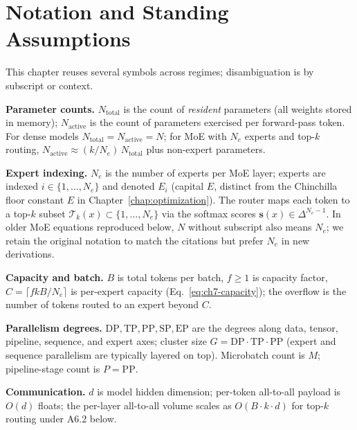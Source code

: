 \section{Notation and Standing Assumptions}
\label{sec:ch7-notation}

\begin{notationbox}
This chapter reuses several symbols across regimes; disambiguation is
by subscript or context.

\textbf{Parameter counts.}
$N_{\mathrm{total}}$ is the count of \emph{resident} parameters (all
weights stored in memory); $N_{\mathrm{active}}$ is the count of
parameters exercised per forward-pass token. For dense models
$N_{\mathrm{total}} = N_{\mathrm{active}} = N$; for MoE with $N_e$
experts and top-$k$ routing,
$N_{\mathrm{active}} \approx (k/N_e)\,N_{\mathrm{total}}$ plus
non-expert parameters.

\textbf{Expert indexing.}
$N_e$ is the number of experts per MoE layer; experts are indexed
$i \in \{1, \ldots, N_e\}$ and denoted $E_i$ (capital $E$, distinct
from the Chinchilla floor constant $E$ in Chapter~\ref{chap:optimization}). The router maps
each token to a top-$k$ subset $\mathcal{T}_k(x) \subset \{1, \ldots,
N_e\}$ via the softmax scores $\mathbf{s}(x) \in \Delta^{N_e - 1}$.
In older MoE equations reproduced below, $N$ without subscript also
means $N_e$; we retain the original notation to match the citations
but prefer $N_e$ in new derivations.

\textbf{Capacity and batch.}
$B$ is total tokens per batch, $f \ge 1$ is capacity factor,
$C = \lceil f k B / N_e \rceil$ is per-expert capacity
(Eq.~\eqref{eq:ch7-capacity}); the overflow is the number of tokens
routed to an expert beyond $C$.

\textbf{Parallelism degrees.}
$\mathrm{DP}, \mathrm{TP}, \mathrm{PP}, \mathrm{SP}, \mathrm{EP}$ are
the degrees along data, tensor, pipeline, sequence, and expert axes;
cluster size $G = \mathrm{DP} \cdot \mathrm{TP} \cdot \mathrm{PP}$
(expert and sequence parallelism are typically layered on top).
Microbatch count is $M$; pipeline-stage count is $P = \mathrm{PP}$.

\textbf{Communication.}
$d$ is model hidden dimension; per-token all-to-all payload is $O(d)$
floats; the per-layer all-to-all volume scales as $O(B \cdot k \cdot d)$
for top-$k$ routing under A6.2 below.


\end{notationbox}
